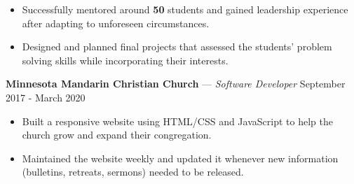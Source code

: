 \documentclass[11pt]{res}
\begin{document}
\begin{footnotesize}
\begin{resume}
\begin{itemize}[leftmargin=6.25mm]
\vspace{1.30mm}
\item Successfully mentored around \textbf{50} students and gained leadership experience after adapting to unforeseen circumstances. 
\vspace{1.30mm}
\item Designed and planned final projects that assessed the students' problem solving skills while incorporating their interests.
\end{itemize}
\vspace{-2.5mm}
\textbf{Minnesota Mandarin Christian Church} — {\sl Software Developer} \hfill September 2017 - March 2020\vspace{-4.5mm}
\begin{itemize}[leftmargin=6.25mm] \itemsep -2pt 
\item Built a responsive website using HTML/CSS and JavaScript to help the church grow and expand their congregation.
\vspace{1.30mm}
\item Maintained the website weekly and updated it whenever new information (bulletins, retreats, sermons) needed to be released. 
\end{itemize}
\begin{small}

\end{small}
\end{resume}
\end{footnotesize}
\end{document}
